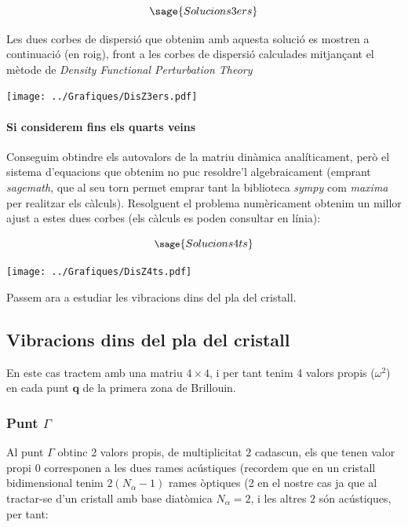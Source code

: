 \documentclass[12pt]{article} %
\let\vec\mathbf %
\begin{document}
\begin{equation}
 \sage{Solucions3ers}
\end{equation}

Les dues corbes de dispersió que obtenim amb aquesta solució es mostren a continuació (en roig), front a les corbes de dispersió calculades mitjançant el mètode de \emph{Density Functional Perturbation Theory}

\begin{center}
\texttt{[image: ../Grafiques/DisZ3ers.pdf]}
\end{center}

\paragraph{Si considerem fins els quarts veins}

Conseguim obtindre els autovalors de la matriu dinàmica analíticament, però el sistema d'equacions que obtenim no puc resoldre'l algebraicament (emprant \textit{sagemath}, que al seu torn permet emprar tant la biblioteca \textit{sympy} com \textit{maxima} per realitzar els càlculs).  Resolguent el problema numèricament obtenim un millor ajust a estes dues corbes (els càlculs es poden consultar en línia):

\begin{equation}\small{
 \sage{Solucions4ts}}
\end{equation}

\begin{center}
\texttt{[image: ../Grafiques/DisZ4ts.pdf]}
\end{center}

Passem ara a estudiar les vibracions dins del pla del cristall.

\subsection{Vibracions dins del pla del cristall}

En este cas tractem amb una matriu $4\times 4$, i per tant tenim 4 valors propis ($\omega^2$) en cada punt $\vec q$ de la primera zona de Brillouin.


\subsubsection{Punt $\Gamma$}

Al punt $\Gamma$ obtinc 2 valors propis, de multiplicitat $2$ cadascun, els que tenen valor propi $0$ corresponen a les dues rames acústiques (recordem que en un cristall bidimensional tenim $2(N_\alpha -1)$ rames òptiques (2 en el nostre cas ja que al tractar-se d'un cristall amb base diatòmica $N_\alpha=2$, i les altres $2$ són acústiques, per tant: 
\end{document}
